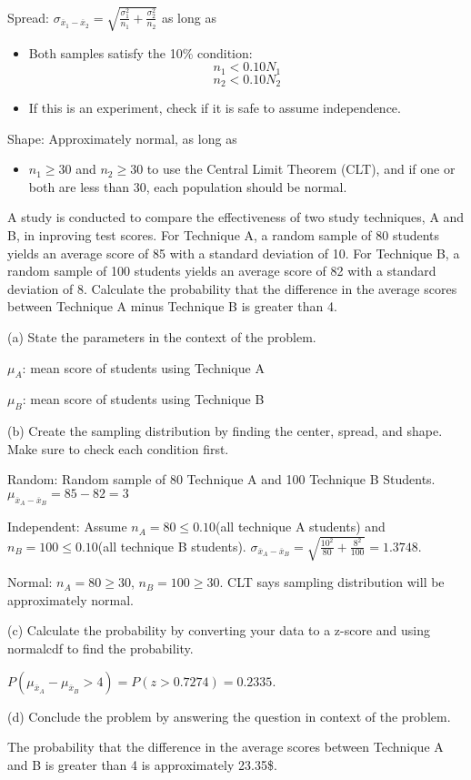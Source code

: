 \documentclass[../stats.tex]{subfiles}
\begin{document}
Spread: $\sigma_{\overline{x}_1-\overline{x}_2}=\sqrt{\frac{\sigma_1^2}{n_1}+\frac{\sigma_2^2}{n_2}}$ as long as 
\begin{itemize}
    \item Both samples satisfy the 10\% condition: 
    \[ n_1<0.10N_1 \] 
    \[ n_2 <0.10 N_2 \]
    \item If this is an experiment, check if it is safe to assume independence.
\end{itemize}

Shape: Approximately normal, as long as 
\begin{itemize}
    \item $n_1\geq 30$ and $n_2\geq 30$ to use the Central Limit Theorem (CLT), and if one or both are less than 30, each population should be normal.
\end{itemize}

\begin{example}
    A study is conducted to compare the effectiveness of two study techniques, A and B, in inproving test scores. For Technique A, a random sample of 80 students yields an average score of 85 with a standard deviation of 10.
    For Technique B, a random sample of 100 students yields an average score of 82 with a standard deviation of 8. Calculate the probability that the difference in the average scores between Technique A minus Technique B is greater than 4.

    (a) State the parameters in the context of the problem.

    $\mu_A$: mean score of students using Technique A 

    $\mu_B$: mean score of students using Technique B 

    (b) Create the sampling distribution by finding the center, spread, and shape. Make sure to check each condition first.

    Random: Random sample of 80 Technique A and 100 Technique B Students. $\mu_{\overline{x}_A-\overline{x}_B} = 85-82=3$

    Independent: Assume $n_A=80\leq 0.10$(all technique A students) and $n_B=100\leq 0.10$(all technique B students). $\sigma_{\overline{x}_A-\overline{x}_B}=\sqrt{\frac{10^2}{80}+\frac{8^2}{100}}=1.3748$.

    Normal: $n_A=80\geq 30$, $n_B=100\geq 30$. CLT says sampling distribution will be approximately normal.

    (c) Calculate the probability by converting your data to a z-score and using normalcdf to find the probability.

    $P(\mu_{\overline{x}_A}-\mu_{\overline{x}_B} > 4) = P(z>0.7274) = 0.2335$.

    (d) Conclude the problem by answering the question in context of the problem.

    The probability that the difference in the average scores between Technique A and B is greater than 4 is approximately 23.35\$.
\end{example}
\end{document}

